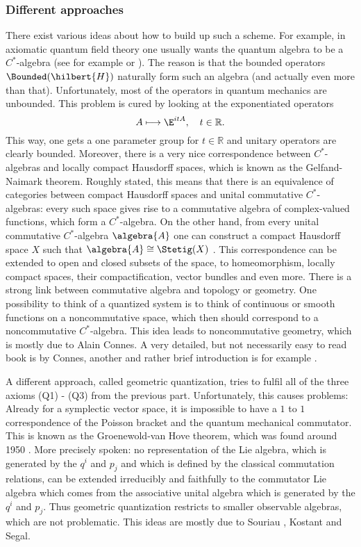 \subsubsection{Different approaches}
There exist various ideas about how to build up such a scheme. For example, in 
axiomatic quantum field theory one usually wants the quantum algebra to be a 
$C^*$-algebra (see for example \cite{haag:1993a} or 
\cite{baer.ginoux.pfaeffle:2007a}). The reason is that the bounded operators 
$\Bounded(\hilbert{H})$ naturally form such an algebra (and actually even more 
than that). Unfortunately, most of the operators in quantum mechanics are 
unbounded. This problem is cured by looking at the exponentiated operators
\begin{equation*}
	A
	\longmapsto
	\E^{i t A},
	\quad t \in \mathbb{R}.
\end{equation*}
This way, one gets a one parameter group for $t \in \mathbb{R}$ and unitary 
operators are clearly bounded. Moreover, there is a very nice correspondence 
between $C^*$-algebras and locally compact Hausdorff spaces, which is known as 
the Gelfand-Naimark theorem. Roughly stated, this means that there is an 
equivalence of categories between compact Hausdorff spaces and unital commutative 
$C^*$-algebras: every such space gives rise to a commutative algebra 
of complex-valued functions, which form a $C^*$-algebra. On the other hand, from 
every unital commutative $C^*$-algebra $\algebra{A}$ one can construct a 
compact Hausdorff space $X$ such that $\algebra{A} \cong \Stetig(X)$ . This 
correspondence can be extended to open and closed subsets of the space, to 
homeomorphism, locally compact spaces, their compactification, vector bundles and 
even more. There is a strong link between commutative algebra and topology or 
geometry. One possibility to think of a quantized system is to think of continuous 
or smooth functions on a noncommutative space, which then should correspond to a 
noncommutative $C^*$-algebra. This idea leads to noncommutative geometry, which 
is mostly due to Alain Connes. A very detailed, but not necessarily easy to read 
book is \cite{connes:1994a} by Connes, another and rather brief introduction is 
for example \cite{varilly:2006a}.


A different approach, called geometric quantization, tries to fulfil all 
of the three axioms (Q1) - (Q3) from the previous part. Unfortunately, this 
causes problems: Already for a symplectic vector space, it is impossible to have a 
$1$ to $1$ correspondence of the Poisson bracket and the quantum mechanical 
commutator. This is known as the Groenewold-van Hove theorem, which was found 
around 1950 \cite{vanhove:1951a, groenewold:1946a}. More precisely spoken: no 
representation of the Lie algebra, which is generated by the $q^i$ and $p_j$ and 
which is defined by the classical commutation relations, can be extended 
irreducibly and faithfully to the commutator Lie algebra which comes from the 
associative unital algebra which is generated by the $q^i$ and $p_j$. Thus 
geometric quantization restricts to smaller observable algebras, which are not 
problematic. This ideas are mostly due to Souriau \cite{souriau:1970a}, Kostant 
and Segal.


